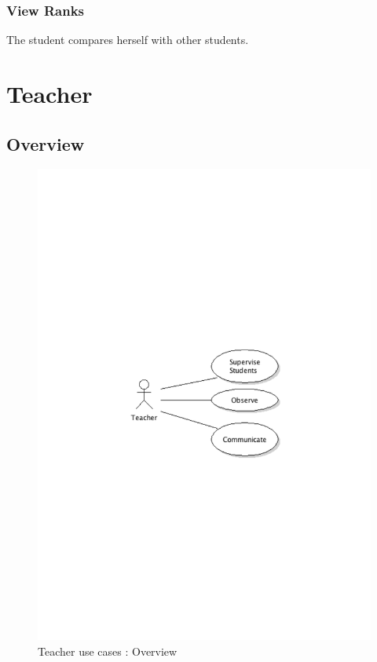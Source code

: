 		\subsubsection{View Ranks}
			The student compares herself with other students.
\newpage
\section{Teacher}
	\subsection{Overview}
		\begin{figure}[ht]
			\begin{center}
				\includegraphics[width=\textwidth,  trim=2cm 11cm 2cm 12cm]{UML_figure/UC/teacher/UC_Teacher_General.pdf}
				\caption{Teacher use cases : Overview}
			\end{center}
		\end{figure}
